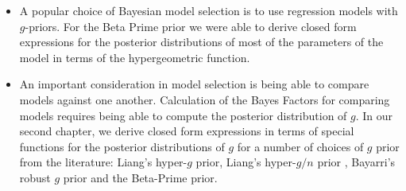 \begin{itemize}




\item A popular choice of Bayesian model selection is to use regression models
with $g$-priors. For the Beta Prime prior \citep{Maruyama2011} we were able to
derive closed form expressions for the posterior distributions of most of the
parameters of the model in terms of the hypergeometric function.




\item An important consideration in model selection is being able to compare
models against one another.  Calculation of the Bayes Factors for comparing
models requires being able to compute the posterior distribution of $g$. In our
second chapter, we derive closed form expressions in terms of special functions
for the posterior distributions of $g$ for a number of choices of $g$ prior from
the literature: Liang's hyper-$g$ prior, Liang's hyper-$g/n$ prior
\citep{Liang2008}, Bayarri's robust $g$ prior \citep{Bayarri2012} and the
Beta-Prime \citep{Maruyama2011} prior.



\end{itemize}
